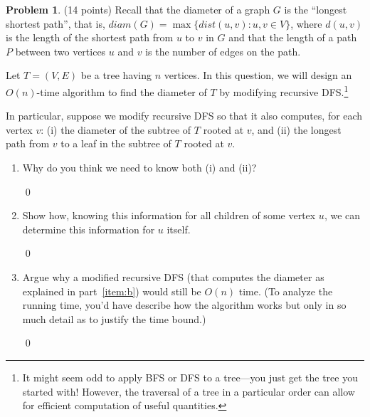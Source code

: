 \documentclass[12pt]{article}
\theoremstyle{definition}
\newtheorem{question}{Problem}
\newenvironment{solution}{\bigskip\noindent{\it Solution.}  \ignorespaces}{\hfill\qed}
\begin{document}
\newpage
\begin{question} \label{q:diameter} (14 points)
Recall that the diameter of a graph $G$ is the ``longest shortest path'', that is, $diam(G) = \max\{dist(u,v) : u,v \in V\}$, where $d(u,v)$ is the length of the shortest path from $u$ to $v$ in $G$ and that the length of a path $P$ between two vertices $u$ and $v$ is the number of edges on the path.


Let $T = (V, E)$ be a tree having $n$ vertices. In this question, we will design an $O(n)$-time algorithm to find the diameter of $T$ by modifying recursive DFS.\footnote{It might seem odd to apply BFS or DFS to a tree---you just get the tree you started with!
However, the traversal of a tree in a particular order can allow for efficient computation of useful quantities.}

In particular, suppose we modify recursive DFS so that it also computes, for each vertex $v$: (i) the diameter of the subtree of $T$ rooted at $v$, and (ii) the longest path from $v$ to a leaf in the subtree of $T$ rooted at $v$.

\begin{enumerate}[label = (\alph*)]

\item Why do you think we need to know both (i) and (ii)?

\begin{solution}
\end{solution}

\item\label{item:b} Show how, knowing this information for all children of some vertex $u$, we can determine this information for $u$ itself.

\begin{solution}
\end{solution}


\item Argue why a modified recursive DFS (that computes the diameter as explained in part~\ref{item:b}) would still be $O(n)$ time. (To analyze the
running time, you'd have describe how the algorithm works but only in so much detail as to justify the time bound.)

\begin{solution}
\end{solution}
\end{enumerate}

\end{question}
\end{document}
